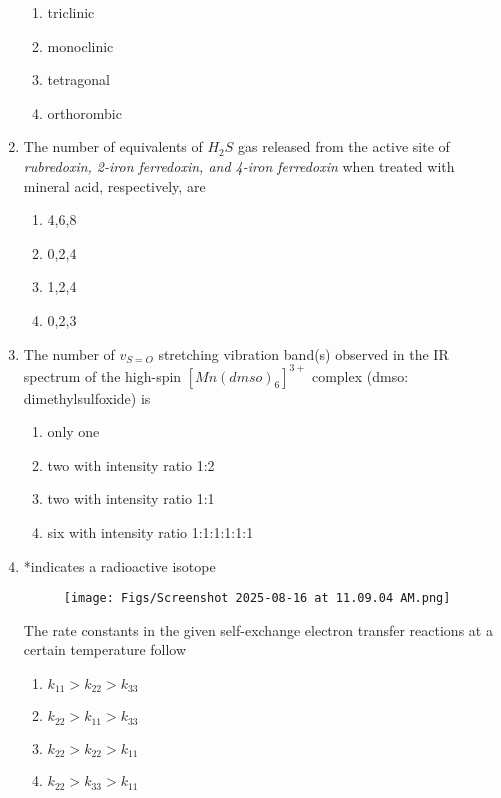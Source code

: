 \documentclass[12pt]{article}
\begin{document}
\begin{enumerate}
\begin{enumerate}
    \item triclinic
    \item monoclinic
    \item tetragonal
    \item orthorombic
\end{enumerate}

\item The number of equivalents of $H_2S$ gas released from the active site of \textit{rubredoxin,
2-iron ferredoxin, and 4-iron ferredoxin} when treated with mineral acid,
respectively, are

\begin{enumerate}
    \item 4,6,8
    \item 0,2,4
    \item 1,2,4
    \item 0,2,3
\end{enumerate}


\item The number of $v_{S=O}$ stretching vibration band(s) observed in the IR spectrum of
the high-spin ${[Mn(dmso)_6]}^{3+}$ complex (dmso: dimethylsulfoxide) is

\begin{enumerate}
    \item only one
    \item two with intensity ratio 1:2
    \item two with intensity ratio 1:1
    \item six with intensity ratio 1:1:1:1:1:1

\end{enumerate}



\item 

*indicates a radioactive isotope \\

\begin{figure}[H]
\centering
\texttt{[image: Figs/Screenshot 2025-08-16 at 11.09.04 AM.png]}
\caption{}
\end{figure} 
The rate constants in the given self-exchange electron transfer reactions at a
certain temperature follow

\begin{enumerate}
    \item $k_{11} > k_{22} > k_{33}$
    \item $k_{22} > k_{11} > k_{33}$
    \item $k_{22} > k_{22} > k_{11}$
    \item $k_{22} > k_{33} > k_{11}$
    

\end{enumerate}
\end{enumerate}
\end{document}
